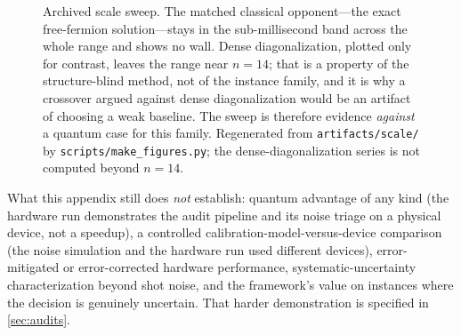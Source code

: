 \begin{figure}[htbp]
\centering
{}
\caption{Archived scale sweep. The matched classical opponent---the exact free-fermion solution---stays in the sub-millisecond band across the whole range and shows no wall. Dense diagonalization, plotted only for contrast, leaves the range near $n=14$; that is a property of the structure-blind method, not of the instance family, and it is why a crossover argued against dense diagonalization would be an artifact of choosing a weak baseline. The sweep is therefore evidence \emph{against} a quantum case for this family. Regenerated from \texttt{artifacts/scale/} by \texttt{scripts/make\_figures.py}; the dense-diagonalization series is not computed beyond $n=14$.}
\label{fig:scale-sweep}
\end{figure}

What this appendix still does \emph{not} establish: quantum advantage of any kind (the hardware run demonstrates the audit pipeline and its noise triage on a physical device, not a speedup), a controlled calibration-model-versus-device comparison (the noise simulation and the hardware run used different devices), error-mitigated or error-corrected hardware performance, systematic-uncertainty characterization beyond shot noise, and the framework's value on instances where the decision is genuinely uncertain. That harder demonstration is specified in \cref{sec:audits}.
